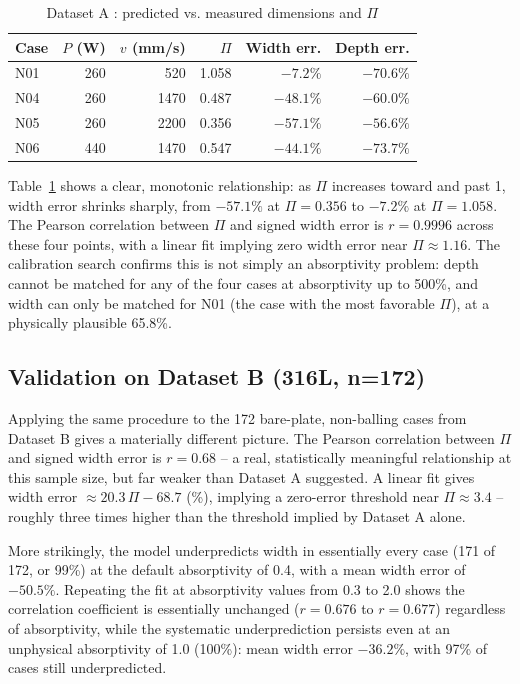 \documentclass[12pt]{article}
\begin{document}
\begin{table}[!t]
\centering
\caption{Dataset A \cite{zhang2024}: predicted vs. measured dimensions and $\Pi$}
\label{tab:validationA}
\begin{tabular}{@{}lrrrrr@{}}
\toprule
Case & $P$ (W) & $v$ (mm/s) & $\Pi$ & Width err. & Depth err. \\
\midrule
N01 & 260 & 520  & 1.058 & $-7.2\%$  & $-70.6\%$ \\
N04 & 260 & 1470 & 0.487 & $-48.1\%$ & $-60.0\%$ \\
N05 & 260 & 2200 & 0.356 & $-57.1\%$ & $-56.6\%$ \\
N06 & 440 & 1470 & 0.547 & $-44.1\%$ & $-73.7\%$ \\
\bottomrule
\end{tabular}
\end{table}

Table~\ref{tab:validationA} shows a clear, monotonic relationship: as $\Pi$ increases toward and past 1, width error shrinks sharply, from $-57.1\%$ at $\Pi=0.356$ to $-7.2\%$ at $\Pi=1.058$. The Pearson correlation between $\Pi$ and signed width error is $r=0.9996$ across these four points, with a linear fit implying zero width error near $\Pi\approx1.16$. The calibration search confirms this is not simply an absorptivity problem: depth cannot be matched for any of the four cases at absorptivity up to 500\%, and width can only be matched for N01 (the case with the most favorable $\Pi$), at a physically plausible 65.8\%.

\subsection{Validation on Dataset B (316L, n=172)}

Applying the same procedure to the 172 bare-plate, non-balling cases from Dataset B gives a materially different picture. The Pearson correlation between $\Pi$ and signed width error is $r=0.68$ -- a real, statistically meaningful relationship at this sample size, but far weaker than Dataset A suggested. A linear fit gives width error $\approx 20.3\,\Pi - 68.7$ (\%), implying a zero-error threshold near $\Pi\approx3.4$ -- roughly three times higher than the threshold implied by Dataset A alone.

More strikingly, the model underpredicts width in essentially every case (171 of 172, or 99\%) at the default absorptivity of 0.4, with a mean width error of $-50.5\%$. Repeating the fit at absorptivity values from 0.3 to 2.0 shows the correlation coefficient is essentially unchanged ($r=0.676$ to $r=0.677$) regardless of absorptivity, while the systematic underprediction persists even at an unphysical absorptivity of 1.0 (100\%): mean width error $-36.2\%$, with 97\% of cases still underpredicted.
\end{document}
